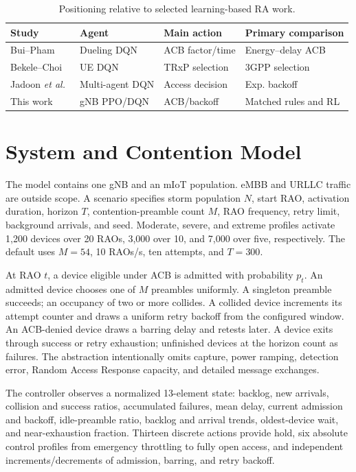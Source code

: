 \documentclass[conference]{IEEEtran}
\begin{document}
\begin{table}[t]
\caption{Positioning relative to selected learning-based RA work.}
\label{tab:prior}
\centering\scriptsize
\setlength{\tabcolsep}{2pt}
\begin{tabular}{p{}p{}p{}p{}}
\toprule
Study & Agent & Main action & Primary comparison\\
\midrule
Bui--Pham~\cite{bui2020} & Dueling DQN & ACB factor/time & Energy--delay ACB\\
Bekele--Choi~\cite{bekele2021} & UE DQN & TRxP selection & 3GPP selection\\
Jadoon \emph{et al.}~\cite{jadoon2022} & Multi-agent DQN & Access decision & Exp. backoff\\
This work & gNB PPO/DQN & ACB/backoff & Matched rules and RL\\
\bottomrule
\end{tabular}
\end{table}

\section{System and Contention Model}
The model contains one gNB and an mIoT population. eMBB and URLLC traffic are outside scope. A scenario specifies storm population $N$, start RAO, activation duration, horizon $T$, contention-preamble count $M$, RAO frequency, retry limit, background arrivals, and seed. Moderate, severe, and extreme profiles activate 1,200 devices over 20 RAOs, 3,000 over 10, and 7,000 over five, respectively. The default uses $M=54$, 10 RAOs/s, ten attempts, and $T=300$.

At RAO $t$, a device eligible under ACB is admitted with probability $p_t$. An admitted device chooses one of $M$ preambles uniformly. A singleton preamble succeeds; an occupancy of two or more collides. A collided device increments its attempt counter and draws a uniform retry backoff from the configured window. An ACB-denied device draws a barring delay and retests later. A device exits through success or retry exhaustion; unfinished devices at the horizon count as failures. The abstraction intentionally omits capture, power ramping, detection error, Random Access Response capacity, and detailed message exchanges.

The controller observes a normalized 13-element state: backlog, new arrivals, collision and success ratios, accumulated failures, mean delay, current admission and backoff, idle-preamble ratio, backlog and arrival trends, oldest-device wait, and near-exhaustion fraction. Thirteen discrete actions provide hold, six absolute control profiles from emergency throttling to fully open access, and independent increments/decrements of admission, barring, and retry backoff.
\end{document}
